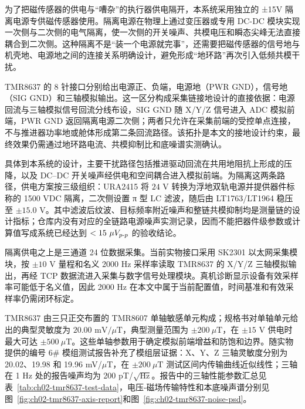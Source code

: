 为了把磁传感器的供电与``嘈杂''的执行器供电隔开，本系统采用独立的 ±15V 隔离电源专供磁传感器使用。隔离电源在物理上通过变压器或专用 DC-DC 模块实现一次侧与二次侧的电气隔离，使一次侧的开关噪声、共模电压和瞬态尖峰无法直接耦合到二次侧。这种隔离不是``装一个电源就完事''，还需要把磁传感器的信号地与机壳地、电源地之间的连接关系明确设计，避免形成``地环路''再次引入低频共模干扰。

TMR8637 的 8 针接口分别给出电源正、负端，电源地（PWR GND），信号地（SIG GND）和三轴模拟输出\cite{multidimension2024tmr8607}。这一区分构成采集链接地设计的直接依据：电源回流与三轴模拟信号回流分线布设，SIG GND 随 X/Y/Z 信号进入 ADC 模拟前端，PWR GND 返回隔离电源二次侧；两者只允许在采集前端的受控单点连接，不与推进器功率地或舱体形成第二条回流路径。该拓扑是本文的接地设计约束，最终效果仍需通过地环路电流、共模抑制比和底噪谱实测确认。

具体到本系统的设计，主要干扰路径包括推进驱动回流在共用地阻抗上形成的压降，以及 DC--DC 开关噪声经供电和空间耦合进入模拟前端。为隔离这两条路径，供电方案按三级组织：URA2415 将 \(24\text{ V}\) 转换为浮地双轨电源并提供器件标称的 1500 VDC 隔离，二次侧设置 π 型 LC 滤波，随后由 LT1763/LT1964 稳压至 \(\pm15.0\text{ V}\)。其中滤波后纹波、目标频率附近噪声和整链共模抑制均是测量链的设计指标；仓库内没有对应的全链路电源噪声实测记录，因而不能把器件级参数或计算值写成系统已经达到 \(<15\ \mu V_{p\text-p}\) 的验收结论。

隔离供电之上是三通道 24 位数据采集。当前实物接口采用 SK2301 以太网采集模块，按 \(\pm10\text{ V}\) 量程和名义 2000 Hz 采样率读取 TMR8637 的 X/Y/Z 三轴模拟输出，再经 TCP 数据流进入采集与数字信号处理模块。真机诊断显示设备有效采样率可能低于名义值，因此 2000 Hz 在本文中属于当前配置值，时间基准和有效采样率仍需闭环标定。

TMR8637 由三只正交布置的 TMR8607 单轴敏感单元构成；规格书对单轴单元给出的典型灵敏度为 \(20.00\text{ mV}/\mu\text{T}\)，典型测量范围为 \(\pm200\ \mu\text{T}\)，在 \(\pm15\text{ V}\) 供电时最大可达 \(\pm500\ \mu\text{T}\)\cite{multidimension2024tmr8607}。这些单轴参数用于确定模拟前端增益和防饱和边界。随实物提供的编号 6\# 模组测试报告补充了模组层证据：X、Y、Z 三轴灵敏度分别为 20.02、19.98 和 19.96 mV/\(\mu\)T，在 \(\pm200\ \mu\text{T}\) 测试区间内传输曲线近似线性；三轴在 1 Hz 处的报告噪声均为 200 pT/\(\sqrt{\text{Hz}}\)。报告中的三轴性能参数汇总见表~\ref{tab:ch02-tmr8637-test-data}，电压-磁场传输特性和本底噪声谱分别见图~\ref{fig:ch02-tmr8637-axis-report}和图~\ref{fig:ch02-tmr8637-noise-psd}。

